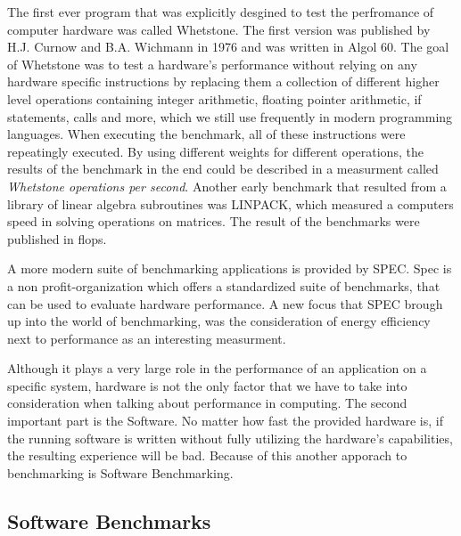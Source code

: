 \cite{heiseGtx2080}

The first ever program that was explicitly desgined to test the perfromance of
computer hardware was called Whetstone. The first version was published by H.J.
Curnow and B.A. Wichmann in 1976 and was written in Algol 60. The goal of
Whetstone was to test a hardware's performance without relying on any hardware
specific instructions by replacing them a collection of different higher level
operations containing integer arithmetic, floating pointer arithmetic, if
statements, calls and more, which we still use frequently in modern programming
languages. When executing the benchmark, all of these instructions were
repeatingly executed. By using different weights for different operations, the
results of the benchmark in the end could be described in a measurment called
\emph{Whetstone operations per second}.  Another early benchmark that resulted
from a library of linear algebra
subroutines was LINPACK, which measured a computers speed in solving operations
on matrices. The result of the benchmarks were published in \gls{flops}.

\cite{OverviewBenchmarks}

A more modern suite of benchmarking applications is provided by SPEC. Spec is a
non profit-organization which offers a standardized suite of benchmarks, that
can be used to evaluate hardware performance. A new focus that SPEC brough up
into the world of benchmarking, was the consideration of energy efficiency next
to performance as an interesting measurment.

\cite{Spec}

Although it plays a very large role in the performance of an application on a
specific system, hardware is not the only factor that we have to take into
consideration when talking about performance in computing. The second important
part is the Software. No matter how fast the provided hardware is, if the
running software is written without fully utilizing the hardware's capabilities,
the resulting experience will be bad.  Because of this another apporach to
benchmarking is Software Benchmarking.





\subsection{Software Benchmarks}

